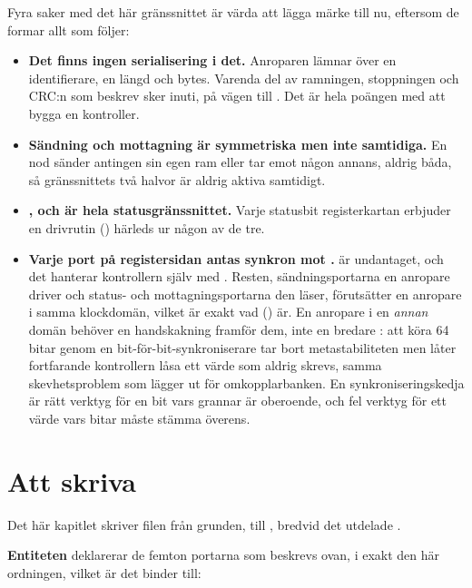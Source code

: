 Fyra saker med det här gränssnittet är värda att lägga märke till nu, eftersom de formar allt som
följer:
\begin{itemize}
  \item \textbf{Det finns ingen serialisering i det.} Anroparen lämnar över en identifierare, en
    längd och bytes. Varenda del av ramningen, stoppningen och CRC:n som  beskrev
    sker inuti, på vägen till . Det är hela poängen med att bygga en kontroller.
  \item \textbf{Sändning och mottagning är symmetriska men inte samtidiga.} En nod sänder antingen
    sin egen ram eller tar emot någon annans, aldrig båda, så gränssnittets två halvor är aldrig
    aktiva samtidigt.
  \item \textbf{,  och  är hela statusgränssnittet.} Varje
    statusbit registerkartan erbjuder en drivrutin () härleds ur någon av de tre.
  \item \textbf{Varje port på registersidan antas synkron mot .}  är
    undantaget, och det hanterar kontrollern själv med . Resten, sändningsportarna en
    anropare driver och status- och mottagningsportarna den läser, förutsätter en anropare i samma
    klockdomän, vilket är exakt vad  () är. En anropare i en
    \emph{annan} domän behöver en handskakning framför dem, inte en bredare : att
    köra 64 bitar  genom en bit-för-bit-synkroniserare tar bort metastabiliteten men
    låter fortfarande kontrollern låsa ett värde som aldrig skrevs, samma skevhetsproblem som
     lägger ut för omkopplarbanken. En synkroniseringskedja är rätt verktyg för en
    bit vars grannar är oberoende, och fel verktyg för ett värde vars bitar måste stämma överens.
\end{itemize}

\section{Att skriva }
\label{c11:sec:writing}

Det här kapitlet skriver filen från grunden, till , bredvid det
utdelade .

\textbf{Entiteten} deklarerar de femton portarna som beskrevs ovan, i exakt den här ordningen, vilket
är det  binder till:

